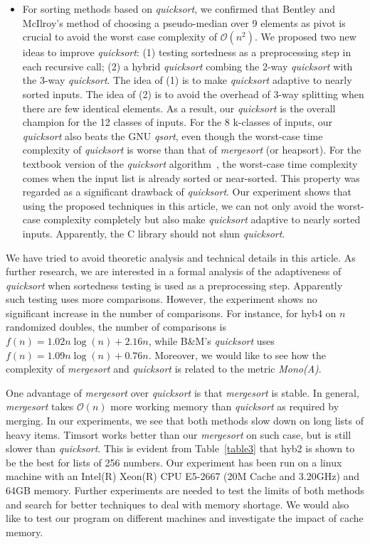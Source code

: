 \documentclass[AMA,STIX1COL]{WileyNJD-v2}
\newcommand {\mono}{\emph{Mono(A)}}
\newcommand{\qusort}{\emph{quicksort }}
\newcommand{\qusortn}{\emph{quicksort}}
\newcommand{\qsortn}{\emph{qsort}}
\newcommand{\msort}{\emph{mergesort }}
\begin{document}
\begin{itemize}
\item For sorting methods based on \qusortn, we confirmed that Bentley and McIlroy’s method of choosing a pseudo-median over 9 elements as pivot is crucial to avoid the worst case complexity of $\mathcal{O}(n^2)$. 
We proposed two new ideas to improve \qusortn: (1) testing sortedness as a preprocessing step in each recursive call; (2) a hybrid \qusort combing the 2-way \qusort with the 3-way \qusortn. The idea of (1) is to make \qusort adaptive to nearly sorted inputs. The idea of (2) is to avoid the overhead of 3-way splitting when there are few identical elements. As a result, our \qusort is the overall champion for the 12 classes of inputs. For the 8 k-classes of inputs, our \qusort also beats the GNU \qsortn, even though the worst-case time complexity of \qusort is worse than that of \msort (or heapsort). For the textbook version of the \qusort algorithm~\cite{10.5555/1614191}, the worst-case time complexity comes when the input list is already sorted or near-sorted. This property was regarded as a significant drawback of \qusortn. Our experiment shows that using the proposed techniques in this article, we can not only avoid the worst-case complexity completely but also make \qusort adaptive to nearly sorted inputs. Apparently, the C library should not shun \qusortn.
\end{itemize}

We have tried to avoid theoretic analysis and technical details in this article. 
As further research, we are interested in a formal analysis of the adaptiveness of \qusort when sortedness testing is used as a preprocessing step. 
Apparently such testing uses more comparisons.  
However, the experiment shows no significant increase in the number of comparisons. 
For instance, for hyb4 on $n$ randomized doubles, the number of comparisons is $f(n) = 1.02n\log(n) + 2.16n$, while B\&M’s \qusort uses $f(n) = 1.09n\log(n) + 0.76n$.  
Moreover, we would like to see how the complexity of \msort and \qusort is related to the metric \mono.

One advantage of \msort over \qusort is that \msort is stable. In general, \msort takes $\mathcal{O}(n)$ more working memory than \qusort as required by merging. 
In our experiments, we see that both methods slow down on long lists of heavy items. Timsort works better than our \msort on such case, but is still slower than \qusortn. 
This is evident from Table~\ref{table3} that hyb2 is shown to be the best for lists of 256 numbers.
Our experiment has been run on a linux machine with an Intel(R) Xeon(R) CPU E5-2667 (20M Cache and 3.20GHz) and 64GB memory. 
Further experiments are needed to test the limits of both methods and search for better techniques to deal with memory shortage. 
We would also like to test our program on different machines and investigate the impact of cache memory. 
\end{document}
